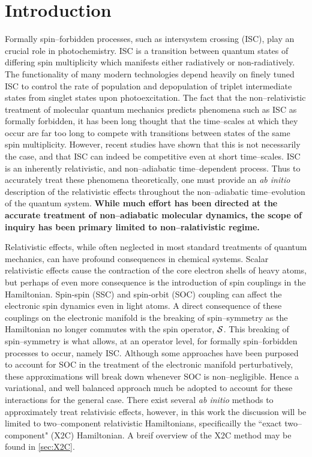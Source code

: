 \section{Introduction}

Formally spin--forbidden processes, such as intersystem crossing (ISC),  play
an crucial role in photochemistry. ISC is a transition between quantum states
of differing spin multiplicity which manifests either radiatively or
non-radiatively.  The functionality of many modern technologies depend heavily
on finely tuned ISC to control the rate of population and depopulation of
triplet intermediate states from singlet states upon photoexcitation. The fact
that the non--relativistic treatment of molecular quantum mechanics predicts
phenomena such as ISC as formally forbidden, it has been long thought that the
time--scales at which they occur are far too long to compete with transitions
between states of the same spin multiplicity. However, recent studies have
shown that this is not necessarily the case, and that ISC can indeed be
competitive even at short time--scales.  ISC is an inherently relativistic, and
non--adiabatic time--dependent process. Thus to accurately treat these phenomena
theoretically, one must provide an \emph{ab initio} description of the
relativistic effects throughout the non--adiabatic time--evolution of the
quantum system.  {\bf While much effort has been directed at the accurate
treatment of non--adiabatic molecular dynamics, the scope of inquiry has been
primary limited to non--ralativistic regime.}

Relativistic effects, while often neglected in most standard treatments of
quantum mechanics, can have profound consequences in chemical
systems.\cite{Pyykko12_45} Scalar relativistic effects cause the contraction of
the core electron shells of heavy atoms, but perhaps of even more consequence is
the introduction of spin couplings in the Hamiltonian.  Spin-spin (SSC) and
spin-orbit (SOC) coupling can affect the electronic spin dynamics even in light
atoms. A direct consequence of these couplings on the electronic manifold is the
breaking of spin--symmetry as the Hamiltonian no longer commutes with the spin
operator, $\mathcal{S}$. This breaking of spin--symmetry is what allows, at an
operator level, for formally spin--forbidden processes to occur, namely
ISC. Although some approaches have been purposed to account for SOC in the
treatment of the electronic manifold perturbatively\cite{Thiel14_JCP124101},
these approximations will break down whenever SOC is non--negligible. Hence a
variational, and well balanced approach much be adopted to account for these
interactions for the general case. There exist several \emph{ab initio} methods
to approximately treat relativisic effects, however, in this work the discussion
will be limited to two--component relativistic Hamiltonians, specificailly the
``exact two--component" (X2C) Hamiltonian. A breif overview of the X2C method
may be found in \cref{sec:X2C}.

